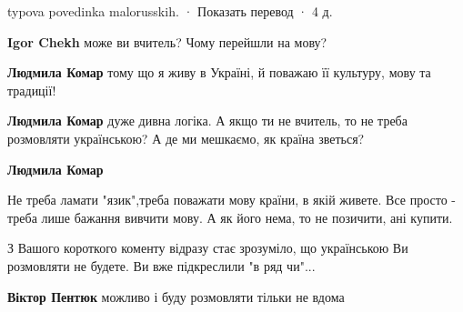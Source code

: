 \begin{itemize}
\begin{itemize}
typova povedinka malorusskih.
 · Показать перевод · 4 д.
 
\textbf{Igor Chekh} може ви вчитель? Чому перейшли на мову?

 
\textbf{Людмила Комар} тому що я живу в Україні, й поважаю її культуру, мову та традиції!

 
\textbf{Людмила Комар} дуже дивна логіка. А якщо ти не вчитель, то не треба розмовляти українською? А де ми мешкаємо, як країна зветься?

 
\textbf{Людмила Комар} 

Не треба ламати "язик",треба поважати мову країни, в якій живете. Все просто -
треба лише бажання вивчити мову. А як його нема, то не позичити, ані купити.

З Вашого короткого коменту відразу стає зрозуміло, що українською Ви розмовляти
не будете. Ви вже підкреслили "в ряд чи"...

 
\textbf{Віктор Пентюк} можливо і буду розмовляти тільки не вдома

 

\end{itemize}
\end{itemize}
